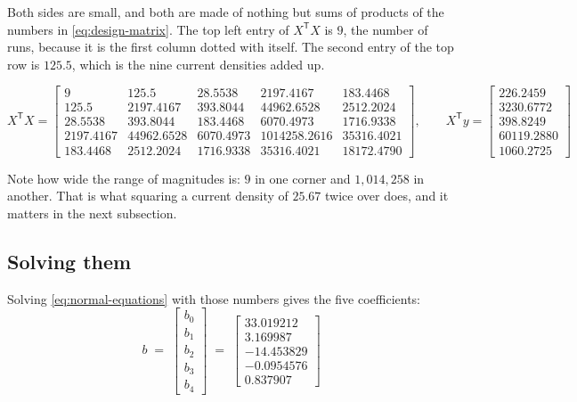 Both sides are small, and both are made of nothing but sums of products of the numbers in
\eqref{eq:design-matrix}. The top left entry of $X^{\mathsf T}X$ is $9$, the number of runs,
because it is the first column dotted with itself. The second entry of the top row is
$125.5$, which is the nine current densities added up.

{\footnotesize
\setlength{\arraycolsep}{4pt}
\begin{equation}
  X^{\mathsf T}X =
  \begin{bmatrix}
    9        & 125.5      & 28.5538   & 2197.4167    & 183.4468   \\
    125.5    & 2197.4167  & 393.8044  & 44962.6528   & 2512.2024  \\
    28.5538  & 393.8044   & 183.4468  & 6070.4973    & 1716.9338  \\
    2197.4167& 44962.6528 & 6070.4973 & 1014258.2616 & 35316.4021 \\
    183.4468 & 2512.2024  & 1716.9338 & 35316.4021   & 18172.4790
  \end{bmatrix},
  \qquad
  X^{\mathsf T}y =
  \begin{bmatrix}
    226.2459 \\ 3230.6772 \\ 398.8249 \\ 60119.2880 \\ 1060.2725
  \end{bmatrix}
  \label{eq:normal-matrices}
\end{equation}
}

Note how wide the range of magnitudes is: $9$ in one corner and $1{,}014{,}258$ in another.
That is what squaring a current density of $25.67$ twice over does, and it matters in the next
subsection.

\subsection{Solving them}

Solving \eqref{eq:normal-equations} with those numbers gives the five coefficients:
%
\begin{equation}
  b \;=\;
  \begin{bmatrix} b_0 \\ b_1 \\ b_2 \\ b_3 \\ b_4 \end{bmatrix}
  \;=\;
  \begin{bmatrix}
    33.019212 \\ 3.169987 \\ -14.453829 \\ -0.0954576 \\ 0.837907
  \end{bmatrix}
  \label{eq:coefficients}
\end{equation}


